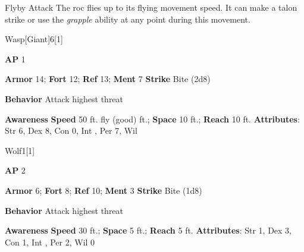 \begin{freeability}{Flyby Attack}
The roc flies up to its flying movement speed.
It can make a talon strike or use the \textit{grapple} ability at any point during this movement.
\end{freeability}

\begin{monsection}{Wasp}[Giant]{6}[1]
\vspace{-1em}\vspace{-1em}
\begin{spellcontent}
\begin{spelltargetinginfo}
{\textbf{AP} 1}

\pari \textbf{Armor} 14;
\textbf{Fort} 12;
\textbf{Ref} 13;
\textbf{Ment} 7
\pari \textbf{Strike} Bite  (2d8)



\pari \textbf{Behavior} Attack highest threat
\end{spelltargetinginfo}
\end{spellcontent}

\begin{monsterfooter}
\pari \textbf{Awareness} 
\pari \textbf{Speed} 50 ft. fly (good) ft.;
\textbf{Space} 10 ft.;
\textbf{Reach} 10 ft.
\pari \textbf{Attributes}:
Str 6,
Dex 8,
Con 0,
Int ,
Per 7,
Wil 
\end{monsterfooter}
\end{monsection}

\begin{monsection}{Wolf}{1}[1]
\vspace{-1em}\vspace{-1em}
\begin{spellcontent}
\begin{spelltargetinginfo}
{\textbf{AP} 2}

\pari \textbf{Armor} 6;
\textbf{Fort} 8;
\textbf{Ref} 10;
\textbf{Ment} 3
\pari \textbf{Strike} Bite  (1d8)



\pari \textbf{Behavior} Attack highest threat
\end{spelltargetinginfo}
\end{spellcontent}

\begin{monsterfooter}
\pari \textbf{Awareness} 
\pari \textbf{Speed} 30 ft.;
\textbf{Space} 5 ft.;
\textbf{Reach} 5 ft.
\pari \textbf{Attributes}:
Str 1,
Dex 3,
Con 1,
Int ,
Per 2,
Wil 0
\end{monsterfooter}
\end{monsection}

